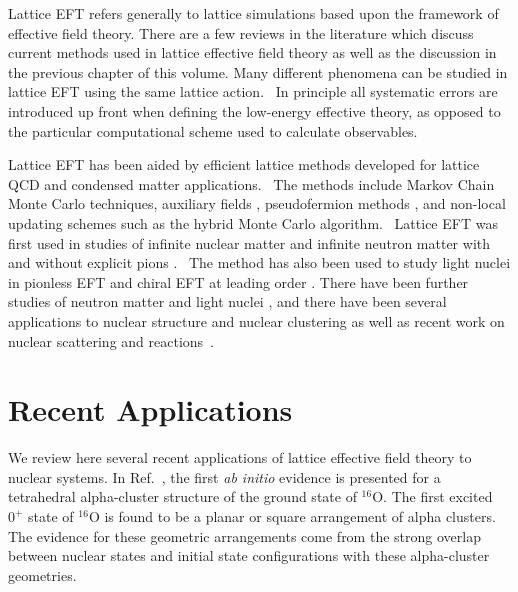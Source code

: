 Lattice EFT refers generally to lattice simulations based upon the framework of effective
field theory.  There are a few reviews in the literature which discuss current methods used
in lattice effective field theory \cite{Lee:2008fa,Drut:2012a} as well as the discussion in the previous chapter of this volume. Many different phenomena can be studied
in
lattice EFT using the same lattice action. \ In principle all systematic
errors are introduced up front when defining the low-energy effective theory,
as opposed to the particular computational scheme used to calculate
observables. \ 

Lattice EFT has been aided by efficient lattice methods developed for lattice QCD and condensed matter applications. \ The methods include
Markov Chain Monte Carlo techniques, auxiliary fields
\cite{Hubbard:1959ub,Stratonovich:1958}, pseudofermion methods
\cite{Weingarten:1980hx}, and non-local updating schemes such as the hybrid Monte
Carlo algorithm\cite{Scalettar:1986uy,Gottlieb:1987mq,Duane:1987de}. \ Lattice EFT
was
first used in studies of infinite nuclear matter \cite{Muller:1999cp} and
infinite neutron matter with and without explicit pions
\cite{Lee:2004si,Lee:2004qd,Lee:2005is,Lee:2005it}. \ The method has also been used
to
study light nuclei in pionless EFT \cite{Borasoy:2005yc} and chiral EFT at
leading order \cite{Borasoy:2006qn}. There have been further studies of neutron matter 
\cite{Borasoy:2007vi,Borasoy:2007vk,Wlazlowski:2014jna} and light nuclei \cite{Epelbaum:2009zs,Epelbaum:2009pd}, and there have been several applications to nuclear structure and nuclear clustering \cite{Epelbaum:2011md,Epelbaum:2012qn,Epelbaum:2012iu,Lahde:2013uqa,Epelbaum:2013paa,Elhatisari:2016owd} as well as recent work on nuclear scattering and reactions~\cite{Rupak:2013aue,Rupak:2014xza,Elhatisari:2015iga}.

\section{Recent Applications}


We review here several recent applications of lattice effective field theory to nuclear systems. In Ref.~\cite{Epelbaum:2013paa},
the first {\it ab initio} evidence is presented for a tetrahedral alpha-cluster structure
of the ground state of $^{16}$O. The first excited $0^+$ state of $^{16}$O is found to be a planar or square arrangement of alpha clusters.  The evidence for these geometric arrangements come from the strong overlap between nuclear states and initial state configurations with these alpha-cluster geometries. 


